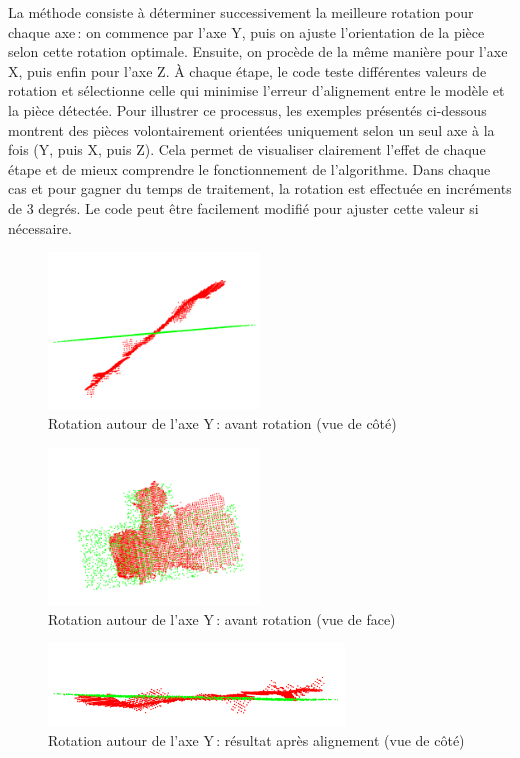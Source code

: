 La méthode consiste à déterminer successivement la meilleure rotation pour chaque axe : on commence par l’axe Y, puis on ajuste l’orientation de la pièce selon cette rotation optimale. Ensuite, on procède de la même manière pour l’axe X, puis enfin pour l’axe Z. À chaque étape, le code teste différentes valeurs de rotation et sélectionne celle qui minimise l’erreur d’alignement entre le modèle et la pièce détectée.
Pour illustrer ce processus, les exemples présentés ci-dessous montrent des pièces volontairement orientées uniquement selon un seul axe à la fois (Y, puis X, puis Z). Cela permet de visualiser clairement l’effet de chaque étape et de mieux comprendre le fonctionnement de l’algorithme. Dans chaque cas et pour gagner du temps de traitement, la rotation est effectuée en incréments de 3 degrés. Le code peut être facilement modifié pour ajuster cette valeur si nécessaire.
\begin{figure}[H]
    \centering
    \includegraphics[width=0.50\textwidth]{assets/figures/rote_y_avt_cote.png}
    \caption{Rotation autour de l’axe Y : avant rotation (vue de côté)}
    \label{fig:rot_y_avt_cote}
\end{figure}
\begin{figure}[H]
    \centering
    \includegraphics[width=0.50\textwidth]{assets/figures/rote_y_avt_face.png}
    \caption{Rotation autour de l’axe Y : avant rotation (vue de face)}
    \label{fig:rot_y_avt_face}
\end{figure}
\begin{figure}[H]
    \centering
    \includegraphics[width=0.70\textwidth]{assets/figures/rot_y_aprs_cote.png}
    \caption{Rotation autour de l’axe Y : résultat après alignement (vue de côté)}
    \label{fig:rot_y_aprs_cote}
\end{figure}
